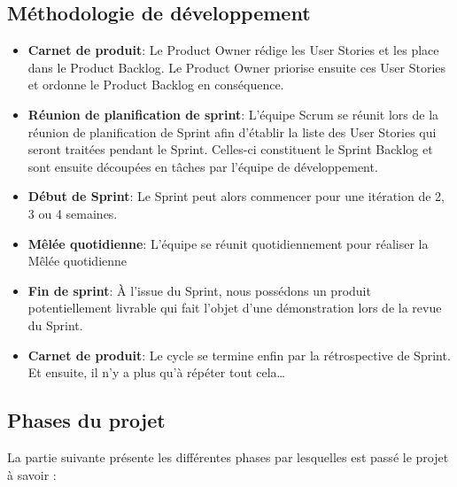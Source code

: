 \subsection{Méthodologie de développement}

\begin{itemize}
  \item \textbf{Carnet de produit}: 
        Le Product Owner rédige les User Stories et les place dans le Product Backlog.
        Le Product Owner priorise ensuite ces User Stories et ordonne le Product
        Backlog en conséquence.
    \\
    \item \textbf{Réunion de planification de sprint}: 
        L’équipe Scrum se réunit lors de la réunion de planification de Sprint afin
        d’établir la liste des User Stories qui seront traitées pendant le Sprint. Celles-ci
        constituent le Sprint Backlog et sont ensuite découpées en tâches par l’équipe
        de développement.
    \\    
    \item \textbf{Début de Sprint}: 
        Le Sprint peut alors commencer pour une itération de 2, 3 ou 4 semaines.
    \\    
    \item \textbf{Mêlée quotidienne}: 
        L’équipe se réunit quotidiennement pour réaliser la Mêlée quotidienne
    \\    
    \item \textbf{Fin de sprint}: 
        À l’issue du Sprint, nous possédons un produit potentiellement livrable qui fait l’objet d’une démonstration lors de la revue du Sprint.
    \\    
    \item \textbf{Carnet de produit}: 
        Le cycle se termine enfin par la rétrospective de Sprint. Et ensuite, il n’y a plus qu’à répéter tout cela…
\end{itemize}

\subsection{Phases du projet}

La partie suivante présente les différentes phases par lesquelles est passé le projet à savoir :

